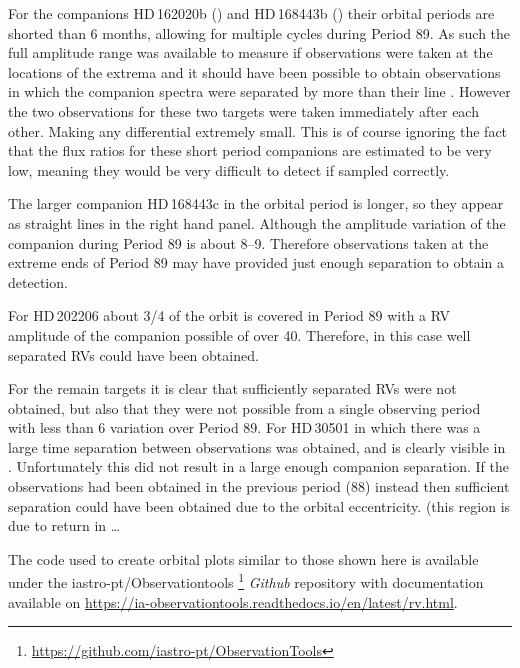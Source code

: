 For the companions {HD\,162020}b () and {HD\,168443}b () their orbital periods are shorted than 6 months, allowing for multiple cycles during Period 89. As such the full amplitude range was available to measure if observations were taken at the locations of the extrema and it should have been possible to obtain observations in which the companion spectra were separated by more than their line \fwhm. However the two observations for these two targets were taken immediately after each other. Making any differential extremely small. This is of course ignoring the fact that the flux ratios for these short period companions are estimated to be very low, meaning they would be very difficult to detect if sampled correctly.

The larger companion {HD\,168443}c in  the orbital period is longer, so they appear as straight lines in the right hand panel. Although the amplitude variation of the companion during Period 89 is about 8--9\kmps. Therefore observations taken at the extreme ends of Period 89 may have provided just enough separation to obtain a detection.

For HD\,202206 about 3/4 of the orbit is covered in Period 89 with a RV amplitude of the companion possible of over 40\kmps{}. Therefore, in this case well separated RVs could have been obtained.

For the remain targets it is clear that sufficiently separated RVs were not obtained, but also that they were not possible from a single observing period with less than 6\kmps{} variation over Period 89.
For HD\,30501 in which there was a large time separation between observations was obtained, and is clearly visible in . Unfortunately this did not result in a large enough companion separation. If the observations had been obtained in the previous period (88) instead then sufficient separation could have been obtained due to the orbital eccentricity. {\red{} (this region is due to return in \ldots}


The code used to create orbital plots similar to those shown here is available under the iastro-pt/Observationtools \footnote{\href{https://github.com/iastro-pt/ObservationTools} {https://github.com/iastro-pt/ObservationTools}} \textit{Github} repository with documentation available on \href{Read the Docs}{https://ia-observationtools.readthedocs.io/en/latest/rv.html}.


